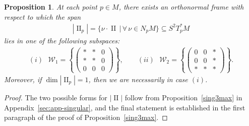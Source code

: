 \documentclass[10pt,a4paper]{amsart}
\def\II{\operatorname{II}} %
\def\W{\mathscr{W}}
\newtheorem{Proposition}[Theorem]{Proposition}
\numberwithin{equation}{section}
\begin{document}
\begin{Proposition} \label{thm1step2}
At each point $p \in M$, there exists an orthonormal frame with respect to which the span
\begin{gather*}
|\II_p| = \{ \nu \cdot \II \,|\, \forall\, \nu \in N_p M\} \subseteq S^2 T^*_p M
\end{gather*}
lies in one of the following subspaces:
\begin{gather*}
\text{$(i)$\ } \W_1 = \left\{\!\!\begin{pmatrix} * & * & 0 \\ * & * & 0 \\ 0 & 0 & 0\end{pmatrix} \!\!\right\} ,\qquad
\text{$(ii)$\ } \W_2 = \left\{\!\! \begin{pmatrix} 0 & 0 & * \\ 0 & 0 & * \\ * & * & *\end{pmatrix} \!\!\right\} .
\end{gather*}
Moreover, if $\dim |\II_p| = 1$, then we are necessarily in case $(i)$.
\end{Proposition}

\begin{proof} The two possible forms for $|\II|$ follow from Proposition~\ref{sing3max} in Appendix~\ref{sec:app-singular}, and the final statement is established in the first paragraph of the proof of Proposition~\ref{sing3max}.
\end{proof}
\end{document}
